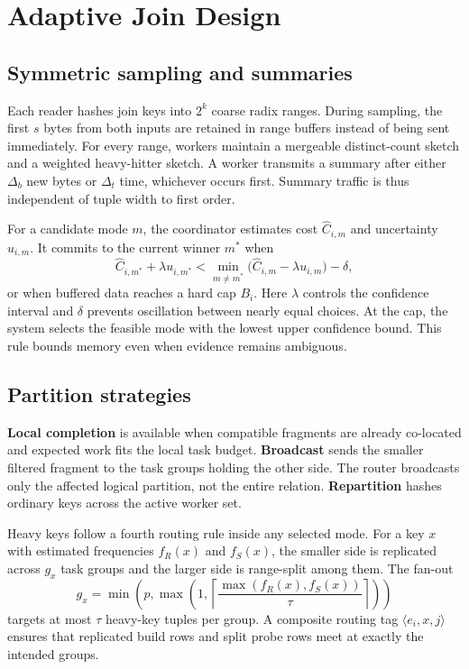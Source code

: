 \section{Adaptive Join Design}
\label{sec:design}

\subsection{Symmetric sampling and summaries}

Each reader hashes join keys into $2^k$ coarse radix ranges.  During sampling,
the first $s$ bytes from both inputs are retained in range buffers instead of
being sent immediately.  For every range, workers maintain a mergeable
distinct-count sketch and a weighted heavy-hitter sketch.  A worker transmits a
summary after either $\Delta_b$ new bytes or $\Delta_t$ time, whichever occurs
first.  Summary traffic is thus independent of tuple width to first order.

For a candidate mode $m$, the coordinator estimates cost $\widehat C_{i,m}$
and uncertainty $u_{i,m}$.  It commits to the current winner $m^*$ when
\begin{equation}
 \widehat C_{i,m^*}+\lambda u_{i,m^*}
 < \min_{m\ne m^*}\bigl(\widehat C_{i,m}-\lambda u_{i,m}\bigr)-\delta,
 \label{eq:confidence}
\end{equation}
or when buffered data reaches a hard cap $B_i$.  Here $\lambda$ controls the
confidence interval and $\delta$ prevents oscillation between nearly equal
choices.  At the cap, the system selects the feasible mode with the lowest
upper confidence bound.  This rule bounds memory even when evidence remains
ambiguous.

\subsection{Partition strategies}

\textbf{Local completion} is available when compatible fragments are already
co-located and expected work fits the local task budget.  \textbf{Broadcast}
sends the smaller filtered fragment to the task groups holding the other side.
The router broadcasts only the affected logical partition, not the entire
relation.  \textbf{Repartition} hashes ordinary keys across the active worker
set.

Heavy keys follow a fourth routing rule inside any selected mode.  For a key
$x$ with estimated frequencies $f_R(x)$ and $f_S(x)$, the smaller side is
replicated across $g_x$ task groups and the larger side is range-split among
them.  The fan-out
\begin{equation}
 g_x=\min\!\left(p,\max\!\left(1,
   \left\lceil\frac{\max(f_R(x),f_S(x))}{\tau}\right\rceil\right)\right)
 \label{eq:fanout}
\end{equation}
targets at most $\tau$ heavy-key tuples per group.  A composite routing tag
$\langle e_i,x,j\rangle$ ensures that replicated build rows and split probe
rows meet at exactly the intended groups.

